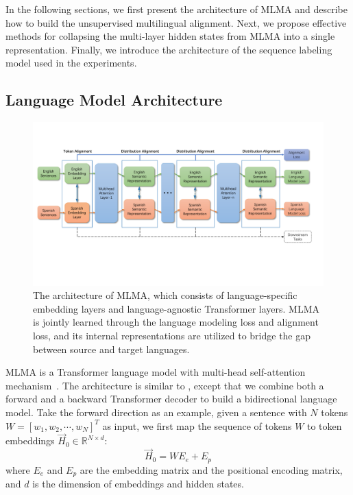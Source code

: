 \documentclass[11pt,a4paper]{article}
\begin{document}
    In the following sections, we first present the architecture of MLMA and describe how to build the unsupervised multilingual alignment. Next, we propose effective methods for collapsing the multi-layer hidden states from MLMA into a single representation. Finally, we introduce the architecture of the sequence labeling model used in the experiments.

	\subsection{Language Model Architecture}
	\begin{figure} 
		\centering
		\includegraphics[trim=0.5cm 5cm 1.3cm 3cm,clip,width=1.0\textwidth]{architecture2.pdf}
		\caption{The architecture of MLMA, which consists of language-specific embedding layers and language-agnostic Transformer layers. MLMA is jointly learned through the language modeling loss and alignment loss, and its internal representations are utilized to bridge the gap between source and target languages. }
		\label{fig:main_architecture}
	\end{figure}
	MLMA is a Transformer language model with multi-head self-attention mechanism~\cite{vaswani2017attention}. The architecture is similar to , except that we combine both a forward and a backward Transformer decoder to build a bidirectional language model. Take the forward direction as an example, given a sentence with $N$ tokens $W = [w_1, w_2, \cdots, w_N]^T$ as input, we first map the sequence of tokens $W$ to token embeddings $\overrightarrow{H}_0 \in \mathbb{R}^{N \times d} $:
	\setlength{\abovedisplayskip}{3pt}
	\setlength{\belowdisplayskip}{3pt}
	\begin{equation}
	\overrightarrow{H}_0 = WE_e + E_p
	\end{equation}
	where $E_e$ and $E_p$ are the embedding matrix and the positional encoding matrix, and $d$ is the dimension of embeddings and hidden states.
	
\end{document}
